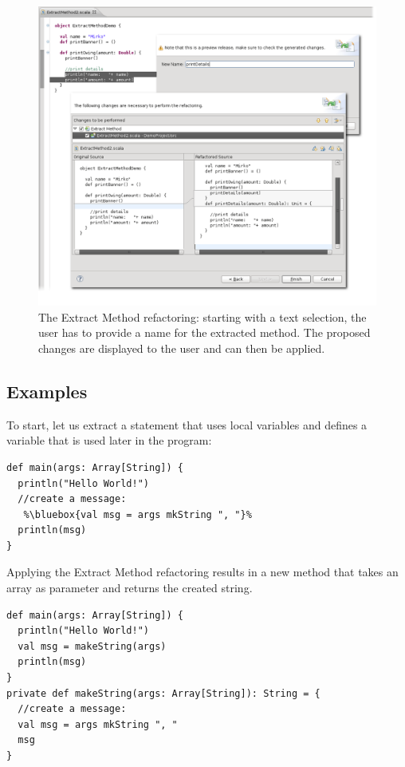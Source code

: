 \documentclass[10pt,a4paper,oneside]{scrreprt}
\begin{document}
\begin{figure}
  \centering
  \includegraphics[width=\linewidth]{extract_method_screenshot_1.png}
  \caption{The Extract Method refactoring: starting with a text selection, the user has to provide a name for the extracted method. The proposed changes are displayed to the user and can then be applied.}
  \label{figure:extract-method-screenshot-1}
\end{figure}

\subsection{Examples}

To start, let us extract a statement that uses local variables and defines a variable that is used later in the program:

\begin{lstlisting}
def main(args: Array[String]) {
  println("Hello World!")
  //create a message:
   %\bluebox{val msg = args mkString ", "}%
  println(msg)
}
\end{lstlisting}

Applying the Extract Method refactoring results in a new method that takes an array as parameter and returns the created string.

\begin{lstlisting}
def main(args: Array[String]) {
  println("Hello World!")
  val msg = makeString(args)
  println(msg)
}
private def makeString(args: Array[String]): String = {
  //create a message:
  val msg = args mkString ", "
  msg
}
\end{lstlisting}
\end{document}
